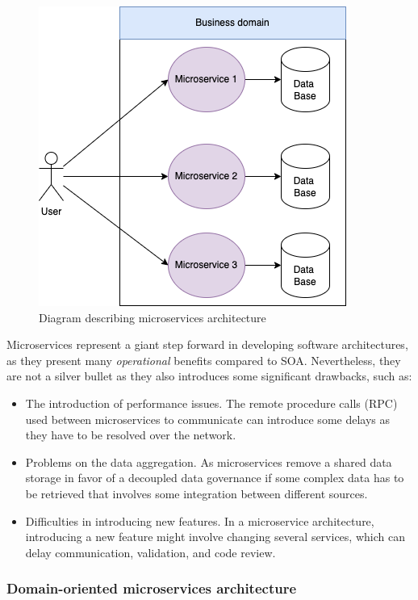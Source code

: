 \documentclass[english, 12pt, a4paper, sci, utf8, a-1b, online]{aaltothesis}
\begin{document}
\begin{figure}[h]
    \centering
    \includegraphics[scale=0.4]{src/thesis/img/literature-review/microservices.png}
    \caption{Diagram describing microservices architecture}
    \label{fig:microservices-architecture}
\end{figure}

Microservices represent a giant step forward in developing software architectures, as they present many \textit{operational} benefits compared to SOA. Nevertheless, they are not a silver bullet as they also introduces some significant drawbacks, such as:

\begin{itemize}
    \item The introduction of performance issues. The remote procedure calls (RPC) used between microservices to communicate can introduce some delays as they have to be resolved over the network.
    \item Problems on the data aggregation.  As microservices remove a shared data storage in favor of a decoupled data governance if some complex data has to be retrieved that involves some integration between different sources.
    \item Difficulties in introducing new features. In a microservice architecture, introducing a new feature might involve changing several services, which can delay communication, validation, and code review.
\end{itemize}

\subsubsection{Domain-oriented microservices architecture}
\label{sec:domain-oriented-microservices-architecture}
\end{document}
